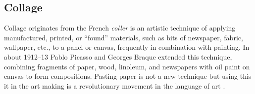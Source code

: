 
\subsection{Collage}
Collage originates from the French \textit{coller} is an artistic technique of applying manufactured, printed, or “found” materials, such as bits of newspaper, fabric, wallpaper, etc., to a panel or canvas, frequently in combination with painting. In about 1912–13 Pablo Picasso and Georges Braque extended this technique, combining fragments of paper, wood, linoleum, and newspapers with oil paint on canvas to form compositions. Pasting paper is not a new technique but using this it in the art making is a revolutionary movement in the  language of art \cite{waldman1992collage}.

